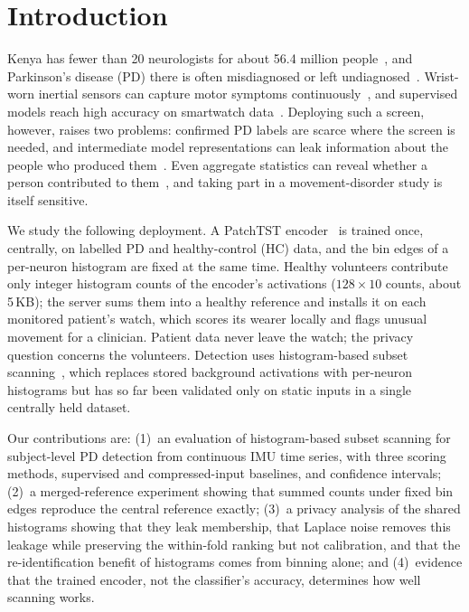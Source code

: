 \documentclass{article}
\begin{document}
\section{Introduction}
\label{sec:intro}

Kenya has fewer than 20 neurologists for about 56.4 million people~\cite{sokhi2023kenya, worldbank2024kenya}, and Parkinson's disease (PD) there is often misdiagnosed or left undiagnosed~\cite{fothergill2021kenya}. Wrist-worn inertial sensors can capture motor symptoms continuously~\cite{cox2024devices}, and supervised models reach high accuracy on smartwatch data~\cite{varghese2024pads}. Deploying such a screen, however, raises two problems: confirmed PD labels are scarce where the screen is needed, and intermediate model representations can leak information about the people who produced them~\cite{hitaj2017gan, dai2025stealing}. Even aggregate statistics can reveal whether a person contributed to them~\cite{homer2008resolving}, and taking part in a movement-disorder study is itself sensitive.

We study the following deployment. A PatchTST encoder~\cite{nie2023patchtst} is trained once, centrally, on labelled PD and healthy-control (HC) data, and the bin edges of a per-neuron histogram are fixed at the same time. Healthy volunteers contribute only integer histogram counts of the encoder's activations ($128 \times 10$ counts, about 5\,KB); the server sums them into a healthy reference and installs it on each monitored patient's watch, which scores its wearer locally and flags unusual movement for a clinician. Patient data never leave the watch; the privacy question concerns the volunteers. Detection uses histogram-based subset scanning~\cite{akumu2023deepscan}, which replaces stored background activations with per-neuron histograms but has so far been validated only on static inputs in a single centrally held dataset.

Our contributions are: (1)~an evaluation of histogram-based subset scanning for subject-level PD detection from continuous IMU time series, with three scoring methods, supervised and compressed-input baselines, and confidence intervals; (2)~a merged-reference experiment showing that summed counts under fixed bin edges reproduce the central reference exactly; (3)~a privacy analysis of the shared histograms showing that they leak membership, that Laplace noise removes this leakage while preserving the within-fold ranking but not calibration, and that the re-identification benefit of histograms comes from binning alone; and (4)~evidence that the trained encoder, not the classifier's accuracy, determines how well scanning works.
\end{document}
